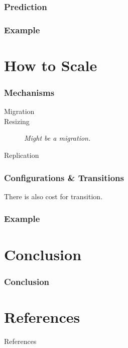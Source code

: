 \documentclass{beamer}
\begin{document}
\begin{frame}
  \frametitle{Prediction}
\end{frame}

\begin{frame}
  \frametitle{Example}
\end{frame}


\section{How to Scale}
\begin{frame}
  \frametitle{Mechanisms}
  \begin{description}
    \item[Migration]
    \item[Resizing] \textit{Might be a migration.}
    \item[Replication]
  \end{description}
\end{frame}

\begin{frame}
  \frametitle{Configurations \& Transitions}
  \vspace*{\fill}
  There is also cost for transition.
\end{frame}

\begin{frame}
  \frametitle{Example}
\end{frame}


\section*{Conclusion}
\begin{frame}
  \frametitle{Conclusion}
\end{frame}


\appendix
\section*{References}
\begin{frame}[allowframebreaks]{References}
  
  
\end{frame}
\end{document}
